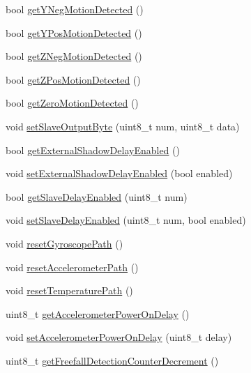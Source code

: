 \begin{DoxyCompactItemize}
\item 
bool \mbox{\hyperlink{classMPU6050_a6c45be7b4aa9081c83ee0f4081bf0827}{get\+Y\+Neg\+Motion\+Detected}} ()
\item 
bool \mbox{\hyperlink{classMPU6050_ad959ec84b9fe9f7e416b7af252f37abc}{get\+Y\+Pos\+Motion\+Detected}} ()
\item 
bool \mbox{\hyperlink{classMPU6050_a3601b732eb15644212b8f29cf396e142}{get\+Z\+Neg\+Motion\+Detected}} ()
\item 
bool \mbox{\hyperlink{classMPU6050_a33c766cd415fc5780417b1ed76717875}{get\+Z\+Pos\+Motion\+Detected}} ()
\item 
bool \mbox{\hyperlink{classMPU6050_a384765351b5c4bd2b6efec9ed71ad1b7}{get\+Zero\+Motion\+Detected}} ()
\item 
void \mbox{\hyperlink{classMPU6050_a34a1def575f6abcd464afe954de8a461}{set\+Slave\+Output\+Byte}} (uint8\+\_\+t num, uint8\+\_\+t data)
\item 
bool \mbox{\hyperlink{classMPU6050_a0e5cb13838298609b5260fd1558f8c92}{get\+External\+Shadow\+Delay\+Enabled}} ()
\item 
void \mbox{\hyperlink{classMPU6050_a9160193d883871037c6535a9d3e02ee2}{set\+External\+Shadow\+Delay\+Enabled}} (bool enabled)
\item 
bool \mbox{\hyperlink{classMPU6050_ae84fd795630f9ab5e8d6b19a616a11ce}{get\+Slave\+Delay\+Enabled}} (uint8\+\_\+t num)
\item 
void \mbox{\hyperlink{classMPU6050_a471929d7cf9049357c345633d22412a9}{set\+Slave\+Delay\+Enabled}} (uint8\+\_\+t num, bool enabled)
\item 
void \mbox{\hyperlink{classMPU6050_af1599c0d70f07fd3e28683d571842c22}{reset\+Gyroscope\+Path}} ()
\item 
void \mbox{\hyperlink{classMPU6050_a99ee74708c12f32e48ef5ec69ac9f4a9}{reset\+Accelerometer\+Path}} ()
\item 
void \mbox{\hyperlink{classMPU6050_a559c2d091d36a4e0489bc639916ddbb6}{reset\+Temperature\+Path}} ()
\item 
uint8\+\_\+t \mbox{\hyperlink{classMPU6050_aae903df2accc687423f9cd0a78f9cd32}{get\+Accelerometer\+Power\+On\+Delay}} ()
\item 
void \mbox{\hyperlink{classMPU6050_a2bbde7653d2d2d37e16e515599f3b08b}{set\+Accelerometer\+Power\+On\+Delay}} (uint8\+\_\+t delay)
\item 
uint8\+\_\+t \mbox{\hyperlink{classMPU6050_af6d6fa9869636989a8b29c4827ad7de8}{get\+Freefall\+Detection\+Counter\+Decrement}} ()
\item 

\end{DoxyCompactItemize}
